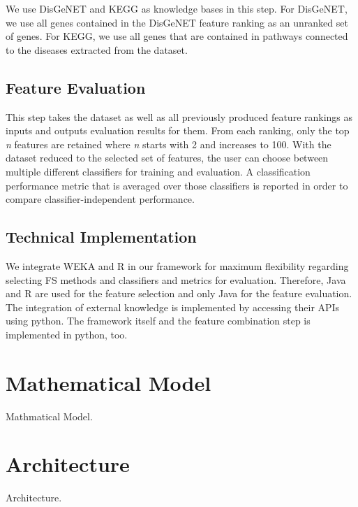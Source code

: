 We use DisGeNET and KEGG as knowledge bases in this step.
For DisGeNET, we use all genes contained in the DisGeNET feature ranking as an unranked set of genes.
For KEGG, we use all genes that are contained in pathways connected to the diseases extracted from the dataset.

\subsection{Feature Evaluation}

This step takes the dataset as well as all previously produced feature rankings as inputs and outputs evaluation results for them.
From each ranking, only the top \emph{n} features are retained where \emph{n} starts with 2 and increases to 100. 
With the dataset reduced to the selected set of features, the user can choose between multiple different classifiers for training and evaluation. 
A classification performance metric that is averaged over those classifiers is reported in order to compare classifier-independent performance.

\subsection{Technical Implementation}

We integrate WEKA\cite{hall2009weka} and R in our framework for maximum flexibility regarding selecting FS methods and classifiers and metrics for evaluation. 
Therefore, Java and R are used for the feature selection and only Java for the feature evaluation.
The integration of external knowledge is implemented by accessing their APIs using python.
The framework itself and the feature combination step is implemented in python, too.

\section{Mathematical Model}
\label{subsec:mathModel}

Mathmatical Model.

\section{Architecture}

Architecture.

